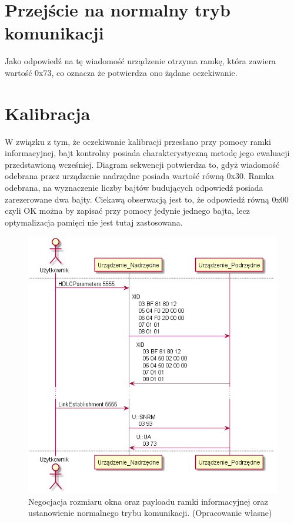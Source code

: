     \section{Przejście na normalny tryb komunikacji}
    Jako odpowiedź na tę wiadomość urządzenie otrzyma ramkę, która zawiera wartość 0x73, co oznacza że 
    potwierdza ono żądane oczekiwanie.

    \section{Kalibracja}
    W związku z tym, że oczekiwanie kalibracji przesłano przy pomocy ramki informacyjnej, bajt kontrolny posiada
    charakterystyczną metodę jego ewaluacji przedstawioną wcześniej. Diagram sekwencji
    potwierdza to, gdyż wiadomość odebrana przez urządzenie nadrzędne posiada wartość równą 0x30.
    Ramka odebrana, na wyznaczenie liczby bajtów budujących odpowiedź posiada zarezerowane dwa bajty. 
    Ciekawą obserwacją jest to, że odpowiedź równą 0x00 czyli OK można by zapisać przy pomocy jedynie jednego bajta, lecz optymalizacja
    pamięci nie jest tutaj zastosowana.

    \begin{figure}[h!]
        \centering
        \includegraphics[scale=0.75]{out/Diagramy/UML_DiagramOfSequence_New/UML_DiagramOfSequence_New-page3.png}
        \caption{Negocjacja rozmiaru okna oraz payloadu ramki informacyjnej oraz ustanowienie normalnego trybu komunikacji.
            \newline(Opracowanie własne)}
        \label{fig:DiagramSequence_HDLCParameters_SNRM}
    \end{figure}

